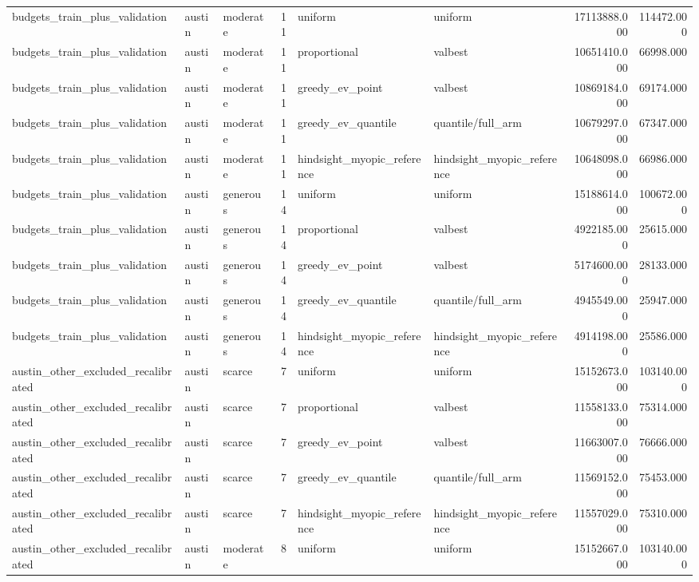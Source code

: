 \begin{tabular}{lllrllrr}
budgets\_train\_plus\_validation & austin & moderate & 11 & uniform & uniform & 17113888.000 & 114472.000 \\
budgets\_train\_plus\_validation & austin & moderate & 11 & proportional & valbest & 10651410.000 & 66998.000 \\
budgets\_train\_plus\_validation & austin & moderate & 11 & greedy\_ev\_point & valbest & 10869184.000 & 69174.000 \\
budgets\_train\_plus\_validation & austin & moderate & 11 & greedy\_ev\_quantile & quantile/full\_arm & 10679297.000 & 67347.000 \\
budgets\_train\_plus\_validation & austin & moderate & 11 & hindsight\_myopic\_reference & hindsight\_myopic\_reference & 10648098.000 & 66986.000 \\
budgets\_train\_plus\_validation & austin & generous & 14 & uniform & uniform & 15188614.000 & 100672.000 \\
budgets\_train\_plus\_validation & austin & generous & 14 & proportional & valbest & 4922185.000 & 25615.000 \\
budgets\_train\_plus\_validation & austin & generous & 14 & greedy\_ev\_point & valbest & 5174600.000 & 28133.000 \\
budgets\_train\_plus\_validation & austin & generous & 14 & greedy\_ev\_quantile & quantile/full\_arm & 4945549.000 & 25947.000 \\
budgets\_train\_plus\_validation & austin & generous & 14 & hindsight\_myopic\_reference & hindsight\_myopic\_reference & 4914198.000 & 25586.000 \\
austin\_other\_excluded\_recalibrated & austin & scarce & 7 & uniform & uniform & 15152673.000 & 103140.000 \\
austin\_other\_excluded\_recalibrated & austin & scarce & 7 & proportional & valbest & 11558133.000 & 75314.000 \\
austin\_other\_excluded\_recalibrated & austin & scarce & 7 & greedy\_ev\_point & valbest & 11663007.000 & 76666.000 \\
austin\_other\_excluded\_recalibrated & austin & scarce & 7 & greedy\_ev\_quantile & quantile/full\_arm & 11569152.000 & 75453.000 \\
austin\_other\_excluded\_recalibrated & austin & scarce & 7 & hindsight\_myopic\_reference & hindsight\_myopic\_reference & 11557029.000 & 75310.000 \\
austin\_other\_excluded\_recalibrated & austin & moderate & 8 & uniform & uniform & 15152667.000 & 103140.000 \\

\end{tabular}
